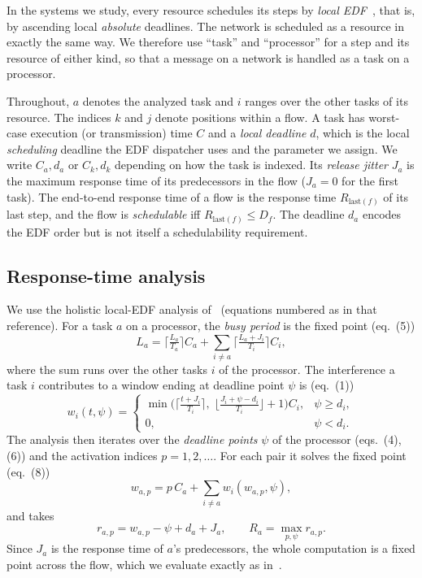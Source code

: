 \documentclass[conference]{IEEEtran}
\begin{document}
In the systems we study, every resource schedules its steps by \emph{local
EDF}~\cite{liu}, that is, by ascending local \emph{absolute} deadlines. The
network is scheduled as a resource in exactly the same way. We therefore use
``task'' and ``processor'' for a step and its resource of either kind, so that a
message on a network is handled as a task on a processor.

Throughout, $a$ denotes the analyzed task and $i$ ranges over the other tasks of
its resource. The indices $k$ and $j$ denote positions within a flow. A task has
worst-case execution (or transmission) time $C$ and a \emph{local deadline} $d$,
which is the local \emph{scheduling} deadline the EDF dispatcher uses and the
parameter we assign. We write $C_a,d_a$ or $C_k,d_k$ depending on how the
task is indexed. Its \emph{release jitter} $J_a$ is the maximum response time of
its predecessors in the flow ($J_a=0$ for the first task). The end-to-end
response time of a flow is the response time $R_{\mathrm{last}(f)}$ of its last
step, and the flow is \emph{schedulable} iff $R_{\mathrm{last}(f)}\le D_f$. The
deadline $d_a$ encodes the EDF order but is not itself a schedulability
requirement.

\subsection{Response-time analysis}
We use the holistic local-EDF analysis of~\cite{hospa} (equations numbered as in
that reference). For a task $a$ on a processor, the \emph{busy period} is the
fixed point (eq.~(5))
\begin{equation}
L_a = \Big\lceil \tfrac{L_a}{T_a}\Big\rceil C_a
      + \sum_{i\ne a} \Big\lceil \tfrac{L_a+J_i}{T_i}\Big\rceil C_i ,
\end{equation}
where the sum runs over the other tasks $i$ of the processor. The interference a
task $i$ contributes to a window ending at deadline point $\psi$ is (eq.~(1))
\begin{equation}
w_i(t,\psi) =
\begin{cases}
\min\!\Big(\big\lceil \tfrac{t+J_i}{T_i}\big\rceil,\;
          \big\lfloor \tfrac{J_i + \psi - d_i}{T_i}\big\rfloor+1\Big) C_i, & \psi \ge d_i,\\[2pt]
0, & \psi < d_i .
\end{cases}
\label{eq:wi}
\end{equation}
The analysis then iterates over the \emph{deadline points} $\psi$ of the
processor (eqs.~(4),(6)) and the activation indices $p=1,2,\dots$. For each pair
it solves the fixed point (eq.~(8))
\begin{equation}
w_{a,p}= p\,C_a + \sum_{i\ne a} w_i\!\left(w_{a,p},\psi\right),
\end{equation}
and takes
\begin{equation}
r_{a,p}= w_{a,p} - \psi + d_a + J_a,\qquad
R_a = \max_{p,\psi} r_{a,p}. \label{eq:ra}
\end{equation}
Since $J_a$ is the response time of $a$'s predecessors, the whole computation
is a fixed point across the flow, which we evaluate exactly as in~\cite{hospa}.
\end{document}
